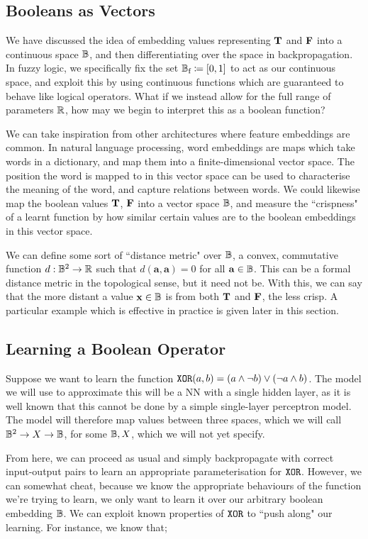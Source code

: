 \subsection{Booleans as Vectors}

We have discussed the idea of embedding values representing $\textbf{T}$ and $\textbf{F}$ into a continuous space $\mathbb{B}$, and then differentiating over the space in backpropagation. In fuzzy logic, we specifically fix the set $\mathbb{B}_\text{f}\coloneqq[0,1]$ to act as our continuous space, and exploit this by using continuous functions which are guaranteed to behave like logical operators. What if we instead allow for the full range of parameters $\mathbb{R}$, how may we begin to interpret this as a boolean function?

We can take inspiration from other architectures where feature embeddings are common. In natural language processing, word embeddings are maps which take words in a dictionary, and map them into a finite-dimensional vector space. The position the word is mapped to in this vector space can be used to characterise the meaning of the word, and capture relations between words. We could likewise map the boolean values $\textbf{T}$, $\textbf{F}$ into a vector space $\mathbb{B}$, and measure the ``crispness" of a learnt function by how similar certain values are to the boolean embeddings in this vector space.

We can define some sort of ``distance metric" over $\mathbb{B}$, a convex, commutative function $d : \mathbb{B}^2 \to \mathbb{R}$ such that $d(\mathbf{a, a}) = 0$ for all $\mathbf{a} \in \mathbb{B}$. This can be a formal distance metric in the topological sense, but it need not be. With this, we can say that the more distant a value $\mathbf{x} \in \mathbb{B}$ is from both $\textbf{T}$ and $\textbf{F}$, the less crisp. A particular example which is effective in practice is given later in this section.

\subsection{Learning a Boolean Operator}

Suppose we want to learn the function $\texttt{XOR}(a, b) = (a \land \lnot b) \lor (\lnot a \land b)$. The model we will use to approximate this will be a NN with a single hidden layer, as it is well known that this cannot be done by a simple single-layer perceptron model. The model will therefore map values between three spaces, which we will call $\mathbb{B}^2 \to X \to \mathbb{B}$, for some $\mathbb{B}, X$, which we will not yet specify.

From here, we can proceed as usual and simply backpropagate with correct input-output pairs to learn an appropriate parameterisation for $\texttt{XOR}$. However, we can somewhat cheat, because we know the appropriate behaviours of the function we're trying to learn, we only want to learn it over our arbitrary boolean embedding $\mathbb{B}$. We can exploit known properties of $\texttt{XOR}$ to ``push along" our learning. For instance, we know that;

